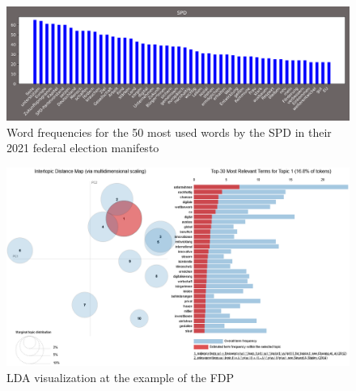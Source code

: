 \documentclass[sigconf,nonacm, 11pt]{acmart}
\begin{document}
\begin{figure}[h]
    \centering
    \includegraphics[height=0.7\linewidth, angle=90]{resources/graph_SPD.png}
    \caption{Word frequencies for the 50 most used words by the SPD in their 2021 federal election manifesto}
    \label{fig:spd_stats_large}
\end{figure}
\clearpage
\begin{figure}[h]
    \centering
    \includegraphics [height=\linewidth, angle=90]{resources/fdp_cluster.png}
    \caption{LDA visualization at the example of the FDP}
    \label{fig:lda_cluster_large}
\end{figure}
\end{document}
